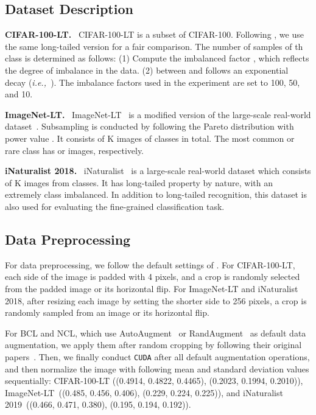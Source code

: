 \documentclass{article}
\newcommand{\ie}{\emph{i.e.,~}}
\newcommand{\myparagraph}[1]{\vspace{0.07cm}\noindent\textbf{#1}~}
\def\code#1{\texttt{#1}}
\newcommand{\alg}{\code{CUDA}\xspace}
\renewcommand*\cite[1]{\citep{#1}}
\begin{document}
\subsection{Dataset Description}

\myparagraph{CIFAR-100-LT.} CIFAR-100-LT is a subset of CIFAR-100. Following \citet{wang2021longtailed, park2022majority, zhu2022balanced}, we use the same long-tailed version for a fair comparison. The number of samples of th class is determined as follows: (1) Compute the imbalanced factor , which reflects the degree of imbalance in the data. (2)  between  and  follows an exponential decay (\ie ). The imbalance factors used in the experiment are set to 100, 50, and 10.

\myparagraph{ImageNet-LT.} ImageNet-LT~\cite{liu2019large} is a modified version of the large-scale real-world dataset~\cite{russakovsky2015imagenet}. Subsampling is conducted by following the Pareto distribution with power value . It consists of K images of  classes in total. The most common or rare class has  or  images, respectively.



\myparagraph{iNaturalist 2018.} iNaturalist~\cite{van2018inaturalist} is a large-scale real-world dataset which consists of K images from  classes. It has long-tailed property by nature, with an extremely class imbalanced. In addition to long-tailed recognition, this dataset is also used for evaluating the fine-grained classification task.




\subsection{Data Preprocessing}
For data preprocessing, we follow the default settings of \citet{cao2019learning}. For CIFAR-100-LT, each side of the image is padded with 4 pixels, and a  crop is randomly selected from the padded image or its horizontal flip. For ImageNet-LT and iNaturalist 2018, after resizing each image by setting the shorter side to 256 pixels, a  crop is randomly sampled from an image or its horizontal flip. 

For BCL and NCL, which use AutoAugment~\cite{cubuk2019autoaugment} or RandAugment~\cite{cubuk2020randaugment} as default data augmentation, we apply them after random cropping by following their original papers~\cite{zhu2022balanced, li2022nested}. Then, we finally conduct \alg after all default augmentation operations, and then normalize the image with following mean and standard deviation values sequentially: CIFAR-100-LT ((0.4914, 0.4822, 0.4465), (0.2023, 0.1994, 0.2010)), ImageNet-LT~((0.485, 0.456, 0.406), (0.229, 0.224, 0.225)), and iNaturalist 2019~((0.466, 0.471, 0.380), (0.195, 0.194, 0.192)).
\end{document}
